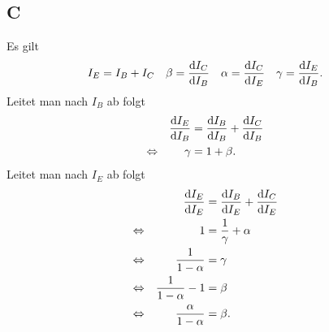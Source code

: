 \documentclass[a4paper,12pt]{article}
\numberwithin{equation}{section}
\begin{document}
\subsection{C}
Es gilt 
\begin{align} 
        I_E&=I_B+I_C&\beta &=\diff[]{I_C}{I_B}&\alpha &=\diff[]{I_C}{I_E}&\gamma &=\diff[]{I_E}{I_B}
.\end{align} 
Leitet man nach $I_B$ ab folgt 
\begin{align} 
        &&\diff[]{I_E}{I_B}&=\diff[]{I_B}{I_B}+\diff[]{I_C}{I_B}&&\\
        \Leftrightarrow &&\gamma &=1+\beta .&&
\end{align} 
Leitet man nach $I_E$ ab folgt
\begin{align} 
        &&\diff[]{I_E}{I_E}&=\diff[]{I_B}{I_E}+\diff[]{I_C}{I_E}&&\\
        \Leftrightarrow &&1&=\dfrac{1}{\gamma }+\alpha &&\nonumber \\
        \Leftrightarrow &&\dfrac{1}{1-\alpha }&=\gamma &&\nonumber \\
        \Leftrightarrow &&\dfrac{1}{1-\alpha }-1&=\beta &&\nonumber \\
        \Leftrightarrow &&\dfrac{\alpha }{1-\alpha }&=\beta .&&
\end{align} 
\end{document}
